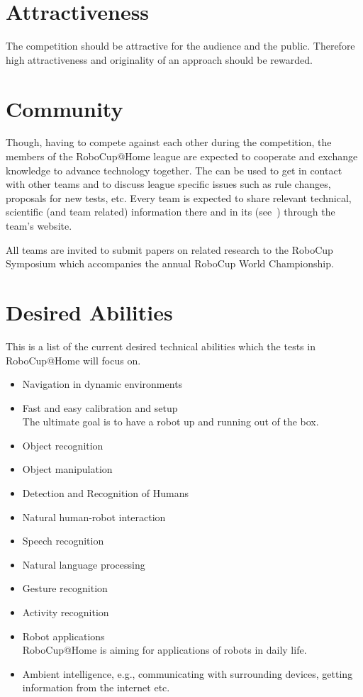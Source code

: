 \section{Attractiveness}
\label{concept:attractiveness}
The competition should be attractive for the audience and the public. Therefore high attractiveness and originality of an approach should be rewarded.

\section{Community}
\label{concept:community}
Though, having to compete against each other during the competition, the members of the RoboCup@Home league are expected to cooperate and exchange knowledge to advance technology together. The  can be used to get in contact with other teams and to discuss league specific issues such as rule changes, proposals for new tests, etc.
Every team is expected to share relevant technical, scientific (and team related) information there and in its  (see~) through the team's website.

All teams are invited to submit papers on related research to the RoboCup Symposium which accompanies the annual RoboCup World Championship.

\section{Desired Abilities}
\label{concept:desired_abilities}
This is a list of the current desired technical abilities which the tests in RoboCup@Home will focus on.

\begin{itemize}
\item Navigation in dynamic environments
\item Fast and easy calibration and setup \\ The ultimate goal is to have a robot up and running out of the box.
\item Object recognition
\item Object manipulation
\item Detection and Recognition of Humans
\item Natural human-robot interaction
\item Speech recognition
\item Natural language processing
\item Gesture recognition
\item Activity recognition
\item Robot applications \\ RoboCup@Home is aiming for applications of robots in daily life.
\item Ambient intelligence, e.g., communicating with surrounding devices, getting information from the internet etc.
\end{itemize}


